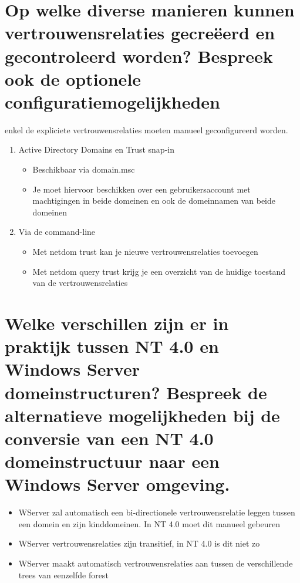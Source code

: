 \section{Op welke diverse manieren kunnen vertrouwensrelaties gecreëerd en
gecontroleerd worden? Bespreek ook de optionele configuratiemogelijkheden}

enkel de expliciete vertrouwensrelaties moeten manueel geconfigureerd worden.

\begin{enumerate}
	\item Active Directory Domains en Trust snap-in
		\begin{itemize}
			\item Beschikbaar via domain.msc
			\item Je moet hiervoor beschikken over een
				gebruikersaccount met machtigingen in beide
				domeinen en ook de domeinnamen van beide
				domeinen
		\end{itemize}
	\item Via de command-line
		\begin{itemize}
			\item Met netdom trust kan je nieuwe vertrouwensrelaties
				toevoegen
			\item Met netdom query trust krijg je een overzicht van
				de huidige toestand van de vertrouwensrelaties
		\end{itemize}
\end{enumerate}

\section{Welke verschillen zijn er in praktijk tussen NT 4.0 en Windows Server
domeinstructuren? Bespreek de alternatieve mogelijkheden bij de conversie van
een NT 4.0 domeinstructuur naar een Windows Server omgeving.}

\begin{itemize}
	\item WServer zal automatisch een bi-directionele vertrouwensrelatie
		leggen tussen een domein en zijn kinddomeinen. In NT 4.0 moet
		dit manueel gebeuren
	\item WServer vertrouwensrelaties zijn transitief, in NT 4.0 is dit niet
		zo
	\item WServer maakt automatisch vertrouwensrelaties aan tussen de
		verschillende trees van eenzelfde forest
\end{itemize}
